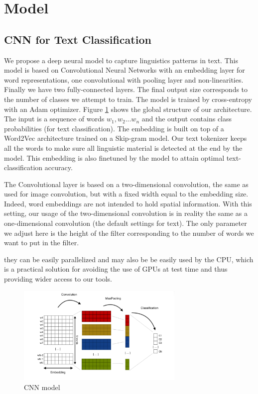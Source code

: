 \section{Model}
\label{sec:model}

\subsection{CNN for Text Classification}

We propose a deep neural model to capture linguistics patterns in text. This model is based on Convolutional Neural Networks with an embedding layer for word representations, one convolutional with pooling layer and non-linearities. Finally we have two fully-connected layers. The final output size corresponds to the number of classes we attempt to train. The model is trained by cross-entropy with an Adam optimizer. Figure \ref{cnn} shows the global structure of our architecture. The input is a sequence of words $ w_{1}, w_{2} ... w_{n} $ and the output contains class probabilities (for text classification). The embedding is built on top of a Word2Vec architecture trained on a Skip-gram model. Our text tokenizer keeps all the words to make sure all linguistic material is detected at the end by the model. This embedding is also finetuned by the model to attain optimal text-classification accuracy. 

The Convolutional layer is based on a two-dimensional convolution, the same as used for image convolution, but with a fixed width equal to the embedding size. Indeed, word embeddings are not intended to hold spatial information. With this setting, our usage of the two-dimensional convolution is in reality the same as a one-dimensional convolution (the default settings for text). The only parameter we adjust here is the height of the filter corresponding to the number of words we want to put in the filter. 

they can be easily parallelized and may also be be easily used by the CPU, which is a practical solution for avoiding the use of GPUs at test time and thus providing wider access to our tools.


\begin{figure}[h]
\begin{center}
\includegraphics[width=8cm]{img/model_classif.png}
\caption{CNN model}
\label{cnn}
\end{center}
\end{figure}

